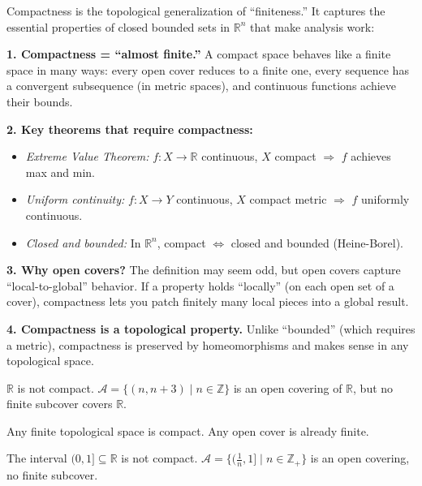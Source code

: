 \documentclass[11pt]{report}
\begin{document}
\begin{rembox}
Compactness is the topological generalization of ``finiteness.'' It captures the essential properties of closed bounded sets in $\mathbb{R}^n$ that make analysis work:

\textbf{1. Compactness = ``almost finite.''} A compact space behaves like a finite space in many ways: every open cover reduces to a finite one, every sequence has a convergent subsequence (in metric spaces), and continuous functions achieve their bounds.

\textbf{2. Key theorems that require compactness:}
\begin{itemize}
    \item \textit{Extreme Value Theorem:} $f: X \to \mathbb{R}$ continuous, $X$ compact $\Rightarrow$ $f$ achieves max and min.
    \item \textit{Uniform continuity:} $f: X \to Y$ continuous, $X$ compact metric $\Rightarrow$ $f$ uniformly continuous.
    \item \textit{Closed and bounded:} In $\mathbb{R}^n$, compact $\Leftrightarrow$ closed and bounded (Heine-Borel).
\end{itemize}

\textbf{3. Why open covers?} The definition may seem odd, but open covers capture ``local-to-global'' behavior. If a property holds ``locally'' (on each open set of a cover), compactness lets you patch finitely many local pieces into a global result.

\textbf{4. Compactness is a topological property.} Unlike ``bounded'' (which requires a metric), compactness is preserved by homeomorphisms and makes sense in any topological space.
\end{rembox}

\begin{exbox}
$\mathbb{R}$ is not compact. $\mathcal{A} = \{(n, n+3) \mid n \in \mathbb{Z}\}$ is an open covering of $\mathbb{R}$, but no finite subcover covers $\mathbb{R}$.
\end{exbox}

\begin{exbox}
Any finite topological space is compact. Any open cover is already finite.
\end{exbox}

\begin{exbox}
The interval $(0, 1] \subseteq \mathbb{R}$ is not compact. $\mathcal{A} = \{(\frac{1}{n}, 1] \mid n \in \mathbb{Z}_+\}$ is an open covering, no finite subcover.
\end{exbox}
\end{document}
